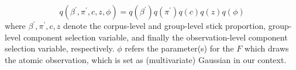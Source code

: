 \documentclass{article}
\begin{document}
\begin{equation}\label{eq:meanfield_vi_hdpgmm}
    q(\beta^{\prime}, \pi^{\prime}, c, z, \phi) = q(\beta^{\prime})q(\pi^{\prime})q(c)q(z)q(\phi)
\end{equation}
where $\beta^{\prime}, \pi^{\prime}, c, z$ denote the corpus-level and group-level stick proportion, group-level component selection variable, and finally the observation-level component selection variable, respectively. $\phi$ refers the parameter(s) for the $F$ which draws the atomic observation, which is set as (multivariate) Gaussian in our context.


\end{document}
